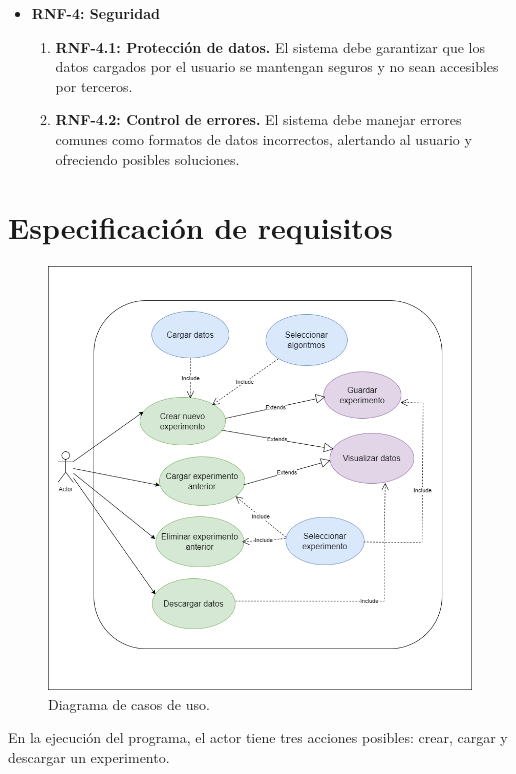 \begin{itemize}
    \item \textbf{RNF-4: Seguridad}
    \begin{enumerate}
        \item \textbf{RNF-4.1: Protección de datos.}  
        El sistema debe garantizar que los datos cargados por el usuario se mantengan seguros y no sean accesibles por terceros.
        \item \textbf{RNF-4.2: Control de errores.}  
        El sistema debe manejar errores comunes como formatos de datos incorrectos, alertando al usuario y ofreciendo posibles soluciones.
    \end{enumerate}
\end{itemize}

\section{Especificación de requisitos}

\begin{figure}[htbp]
    \centering
    \includegraphics[width=1\linewidth]{img/Diagrama_CDU.png}
    \caption{Diagrama de casos de uso.}
    \label{Diagrama de casos de uso}
\end{figure}

En la ejecución del programa, el actor tiene tres acciones posibles: crear, cargar y descargar un experimento.

